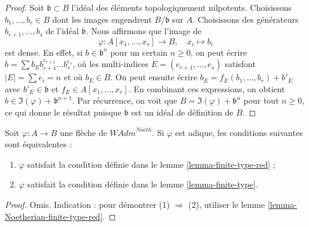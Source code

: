 \begin{proof}
Soit $\mathfrak b \subset B$ l'idéal des éléments topologiquement nilpotents.
Choisissons $b_1, \ldots, b_r \in B$ dont les images engendrent
$B/\mathfrak b$ sur $A$.
Choisissons des générateurs $b_{r + 1}, \ldots, b_s$ de l'idéal
$\mathfrak b$. Nous affirmons que l'image de
$$
\varphi : A[x_1, \ldots, x_s] \longrightarrow B, \quad
x_i \longmapsto b_i
$$
est dense. En effet, si $b \in \mathfrak b^n$ pour un certain $n \geq 0$,
on peut écrire
$b = \sum b_E b_{r + 1}^{e_{r + 1}} \ldots b_s^{e_s}$, où les multi-indices
$E = (e_{r + 1}, \ldots, e_s)$ satisfont $|E| = \sum e_i = n$ et où $b_E \in B$.
On peut ensuite écrire $b_E = f_E(b_1, \ldots, b_r) + b'_E$
avec $b'_E \in \mathfrak b$ et $f_E \in A[x_1, \ldots, x_r]$.
En combinant ces expressions, on obtient $b \in \Im(\varphi) + \mathfrak b^{n + 1}$.
Par récurrence, on voit que $B = \Im(\varphi) + \mathfrak b^n$ pour tout
$n \geq 0$, ce qui donne le résultat puisque $\mathfrak b$ est un idéal
de définition de $B$.
\end{proof}

\begin{lemma}
\label{lemma-Noetherian-adic-finite-type-red}
Soit $\varphi : A \to B$ une flèche de $\textit{WAdm}^{Noeth}$.
Si $\varphi$ est adique, les conditions suivantes sont équivalentes :
\begin{enumerate}
\item $\varphi$ satisfait la condition définie dans le
lemme \ref{lemma-finite-type-red} ;
\item $\varphi$ satisfait la condition définie dans le
lemme \ref{lemma-finite-type}.
\end{enumerate}
\end{lemma}

\begin{proof}
Omis. Indication : pour démontrer (1) $\Rightarrow$ (2), utiliser le
lemme \ref{lemma-Noetherian-finite-type-red}.
\end{proof}

